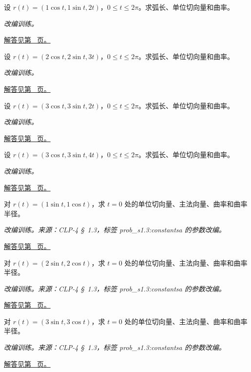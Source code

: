 \documentclass[12pt,fontset=fandol]{ctexart}
\begin{document}
\begin{example}[圆柱螺线的弧长与曲率]\label{ex:c31q15}
设 $r(t)=(1\cos t,1\sin t,2t)$，$0\le t\le2\pi$。求弧长、单位切向量和曲率。
\par\textit{改编训练。}\par\hyperref[ans:c31q15]{解答见第~\pageref{ans:c31q15} 页。}
\end{example}
\begin{example}[圆柱螺线的弧长与曲率]\label{ex:c31q16}
设 $r(t)=(2\cos t,2\sin t,3t)$，$0\le t\le2\pi$。求弧长、单位切向量和曲率。
\par\textit{改编训练。}\par\hyperref[ans:c31q16]{解答见第~\pageref{ans:c31q16} 页。}
\end{example}
\begin{example}[圆柱螺线的弧长与曲率]\label{ex:c31q17}
设 $r(t)=(3\cos t,3\sin t,2t)$，$0\le t\le2\pi$。求弧长、单位切向量和曲率。
\par\textit{改编训练。}\par\hyperref[ans:c31q17]{解答见第~\pageref{ans:c31q17} 页。}
\end{example}
\begin{example}[圆柱螺线的弧长与曲率]\label{ex:c31q18}
设 $r(t)=(3\cos t,3\sin t,4t)$，$0\le t\le2\pi$。求弧长、单位切向量和曲率。
\par\textit{改编训练。}\par\hyperref[ans:c31q18]{解答见第~\pageref{ans:c31q18} 页。}
\end{example}
\begin{example}[圆的定向切向与曲率]\label{ex:c31q19}
对 $r(t)=(1\sin t,1\cos t)$，求 $t=0$ 处的单位切向量、主法向量、曲率和曲率半径。
\par\textit{改编训练。来源：CLP-4 \S~1.3，标签 prob\_s1.3:constantsa 的参数改编。}\par\hyperref[ans:c31q19]{解答见第~\pageref{ans:c31q19} 页。}
\end{example}
\begin{example}[圆的定向切向与曲率]\label{ex:c31q20}
对 $r(t)=(2\sin t,2\cos t)$，求 $t=0$ 处的单位切向量、主法向量、曲率和曲率半径。
\par\textit{改编训练。来源：CLP-4 \S~1.3，标签 prob\_s1.3:constantsa 的参数改编。}\par\hyperref[ans:c31q20]{解答见第~\pageref{ans:c31q20} 页。}
\end{example}
\begin{example}[圆的定向切向与曲率]\label{ex:c31q21}
对 $r(t)=(3\sin t,3\cos t)$，求 $t=0$ 处的单位切向量、主法向量、曲率和曲率半径。
\par\textit{改编训练。来源：CLP-4 \S~1.3，标签 prob\_s1.3:constantsa 的参数改编。}\par\hyperref[ans:c31q21]{解答见第~\pageref{ans:c31q21} 页。}
\end{example}
\end{document}

